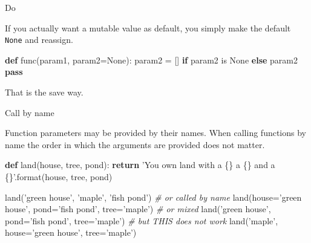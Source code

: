 \documentclass[ignorenonframetext,]{beamer}
\newenvironment{Shaded}{}{}
\newcommand{\KeywordTok}[1]{\textcolor[rgb]{0.00,0.44,0.13}{\textbf{{#1}}}}
\newcommand{\DataTypeTok}[1]{\textcolor[rgb]{0.56,0.13,0.00}{{#1}}}
\newcommand{\StringTok}[1]{\textcolor[rgb]{0.25,0.44,0.63}{{#1}}}
\newcommand{\CommentTok}[1]{\textcolor[rgb]{0.38,0.63,0.69}{\textit{{#1}}}}
\newcommand{\OtherTok}[1]{\textcolor[rgb]{0.00,0.44,0.13}{{#1}}}
\newcommand{\NormalTok}[1]{{#1}}
\begin{document}
\begin{frame}[fragile]

\begin{block}{Do}

If you actually want a mutable value as default, you simply make the
default \texttt{None} and reassign.

\begin{Shaded}
\begin{Highlighting}[]
\KeywordTok{def} \NormalTok{func(param1, param2=}\OtherTok{None}\NormalTok{):}
    \NormalTok{param2 = [] }\KeywordTok{if} \NormalTok{param2 is }\OtherTok{None} \KeywordTok{else} \NormalTok{param2}
    \KeywordTok{pass}
\end{Highlighting}
\end{Shaded}

That is the save way.

\end{block}

\end{frame}

\begin{frame}[fragile]{Call by name}

Function parameters may be provided by their names. When calling
functions by name the order in which the arguments are provided does not
matter.

\begin{Shaded}
\begin{Highlighting}[]
\KeywordTok{def} \NormalTok{land(house, tree, pond):}
    \KeywordTok{return} \StringTok{'You own land with a \{\} a \{\} and a \{\}'}\NormalTok{.}\DataTypeTok{format}\NormalTok{(house, tree, pond)}

\NormalTok{land(}\StringTok{'green house'}\NormalTok{, }\StringTok{'maple'}\NormalTok{, }\StringTok{'fish pond'}\NormalTok{)}
\CommentTok{# or called by name}
\NormalTok{land(house=}\StringTok{'green house'}\NormalTok{, pond=}\StringTok{'fish pond'}\NormalTok{, tree=}\StringTok{'maple'}\NormalTok{)}
\CommentTok{# or mixed}
\NormalTok{land(}\StringTok{'green house'}\NormalTok{, pond=}\StringTok{'fish pond'}\NormalTok{, tree=}\StringTok{'maple'}\NormalTok{)}
\CommentTok{# but THIS does not work}
\NormalTok{land(}\StringTok{'maple'}\NormalTok{, house=}\StringTok{'green house'}\NormalTok{, tree=}\StringTok{'maple'}\NormalTok{)}
\end{Highlighting}
\end{Shaded}

\end{frame}
\end{document}
